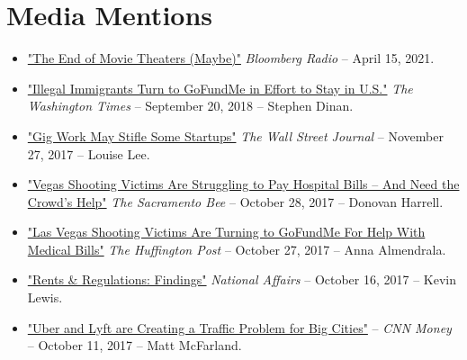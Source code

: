 \documentclass[10.5pt,letterpaper,sans]{moderncv}        %
\begin{document}
\section{Media Mentions}

\begin{itemize}

\item \textcolor{gray}{\href{https://www.bloomberg.com/news/audio/2021-04-15/baystate-business-the-end-of-movie-theaters-maybe-radio}{"The End of Movie Theaters (Maybe)"}} \textit{Bloomberg Radio} -- April 15, 2021.

\item \textcolor{gray}{\href{https://www.washingtontimes.com/news/2018/sep/20/pro-trumpers-turn-gofundme-build-border-wall/}{"Illegal Immigrants Turn to GoFundMe in Effort to Stay in U.S."}} \textit{The Washington Times} -- September 20, 2018 -- Stephen Dinan.

\item \textcolor{gray}{\href{https://www.wsj.com/articles/gig-work-may-stifle-some-startups-1511751901}{"Gig Work May Stifle Some Startups"}}  \textit{The Wall Street Journal} 
-- November 27, 2017 -- Louise Lee.

\item \textcolor{gray}{\href{http://www.sacbee.com/news/nation-world/national/article181505276.html}{"Vegas Shooting Victims Are Struggling to Pay Hospital Bills -- And Need the Crowd's Help"}} \textit{The Sacramento Bee} -- October 28, 2017 -- Donovan Harrell.

\item \textcolor{gray}{\href{https://www.huffingtonpost.com/entry/vegas-shooting-victims-crowdfunding_us_59f3a51be4b07fdc5fbe465c}{"Las Vegas Shooting Victims Are Turning to GoFundMe For Help With Medical Bills"}} \textit{The Huffington Post} -- October 27, 2017 -- Anna Almendrala.

\item \textcolor{gray}{\href{https://nationalaffairs.com/blog/detail/findings-a-daily-roundup/rents-and-regulations}{"Rents \& Regulations: Findings"}} \textit{National Affairs} -- October 16, 2017 -- Kevin Lewis.

\item \textcolor{gray}{\href{https://money.cnn.com/2017/10/11/technology/future/ride-hailing-cities-public-transit/index.html?section=money_topstories}{"Uber and Lyft are Creating a Traffic Problem for Big Cities"}} -- \textit{CNN Money} -- October 11, 2017 -- Matt McFarland.


\end{itemize}
\end{document}

